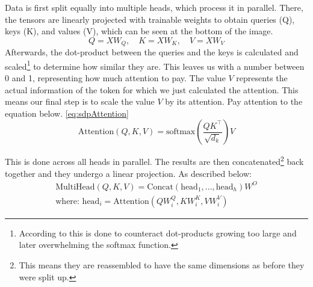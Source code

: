\documentclass{article}
\begin{document}
Data is first split equally into multiple heads, which process it in parallel. There, the tensors are linearly projected with trainable weights to obtain queries (Q), keys (K), and values (V), which can be seen at the bottom of the image.
$$ Q = X W_Q, \quad K = X W_K, \quad V = X W_V $$
Afterwards, the dot-product between the queries and the keys is calculated and scaled\footnote{According to \cite{vaswani2023attentionneed} this is done to counteract dot-products growing too large and later overwhelming the softmax function.} to determine how similar they are. This leaves us with a number between 0 and 1, representing how much attention to pay. The value $V$ represents the actual information of the token for which we just calculated the attention. This means our final step is to scale the value $V$ by its attention. Pay attention to the equation below. \eqref{eq:sdpAttention}
\begin{equation}
    \text{Attention}(Q, K, V) = \text{softmax}\left( \frac{Q K^\top}{\sqrt{d_k}} \right) V \label{eq:sdpAttention}
\end{equation}

This is done across all heads in parallel. The results are then concatenated\footnote{This means they are reassembled to have the same dimensions as before they were split up.} back together and they undergo a linear projection. As described below:
\begin{gather*}
\text{MultiHead}(Q, K, V) = \text{Concat}(\text{head}_1, ..., \text{head}_h) W^O \\
\text{where: } \text{head}_i = \text{Attention}(Q W_i^Q, K W_i^K, V W_i^V)
\end{gather*}

\newpage
\end{document}
